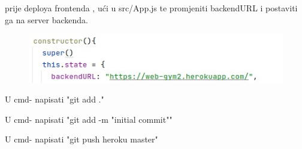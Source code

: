 \begin{packed_item}
\begin{packed_enum}
							\item prije deploya frontenda , ući u src/App.js te promjeniti backendURL i 
							postaviti ga na server backenda.
							
							    \begin{figure}[H]
                        			\hspace*{-1.5cm}
                        			\includegraphics[scale=0.7]{slike/front.png} %
                        			\centering
                        			\label{fig:promjene}
                        		\end{figure}
							
							\item U cmd- napisati "git add ."
							
							\item U cmd- napisati "git add -m "initial commit""
							
							\item U cmd- napisati "git push heroku master"
	

						\end{packed_enum}

				\end{packed_item}
				
			\eject 